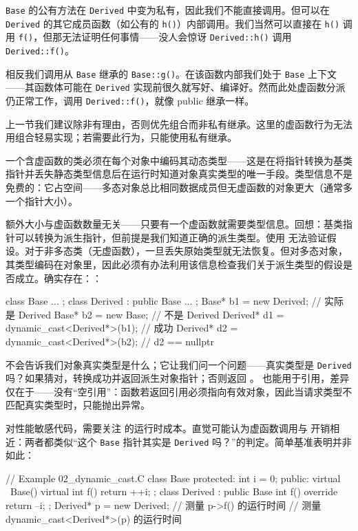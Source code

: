 \texttt{Base} 的公有方法在 \texttt{Derived} 中变为私有，因此我们不能直接调用。但可以在 \texttt{Derived} 的其它成员函数（如公有的 \texttt{h()}）内部调用。我们当然可以直接在 \texttt{h()} 调用 \texttt{f()}，但那无法证明任何事情——没人会惊讶 \texttt{Derived::h()} 调用 \texttt{Derived::f()}。

相反我们调用从 \texttt{Base} 继承的 \texttt{Base::g()}。在该函数内部我们处于 \texttt{Base} 上下文——其函数体可能在 \texttt{Derived} 实现前很久就写好、编译好。然而此处虚函数分派仍正常工作，调用 \texttt{Derived::f()}，就像 public 继承一样。

上一节我们建议除非有理由，否则优先组合而非私有继承。这里的虚函数行为无法用组合轻易实现；若需要此行为，只能使用私有继承。

一个含虚函数的类必须在每个对象中编码其动态类型——这是在将指针转换为基类指针并丢失静态类型信息后在运行时知道对象真实类型的唯一手段。类型信息不是免费的：它占空间——多态对象总比相同数据成员但无虚函数的对象更大（通常多一个指针大小）。

额外大小与虚函数数量无关——只要有一个虚函数就需要类型信息。回想：基类指针可以转换为派生指针，但前提是我们知道正确的派生类型。使用  无法验证假设。对于非多态类（无虚函数），一旦丢失原始类型就无法恢复。但对多态对象，其类型编码在对象里，因此必须有办法利用该信息检查我们关于派生类型的假设是否成立。确实存在：：

\begin{code}
class Base { ... };
class Derived : public Base { ... };
Base* b1 = new Derived;     // 实际是 Derived
Base* b2 = new Base;   // 不是 Derived
Derived* d1 = dynamic_cast<Derived*>(b1);  // 成功
Derived* d2 = dynamic_cast<Derived*>(b2);  // d2 == nullptr
\end{code}

 不会告诉我们对象真实类型是什么；它让我们问一个问题——真实类型是 \texttt{Derived} 吗？如果猜对，转换成功并返回派生对象指针；否则返回 。 也能用于引用，差异仅在于——没有“空引用”：函数若返回引用必须指向有效对象，因此当请求类型不匹配真实类型时，只能抛出异常。

对性能敏感代码，需要关注  的运行时成本。直觉可能认为虚函数调用与  开销相近：两者都类似“这个 \texttt{Base} 指针其实是 \texttt{Derived} 吗？”的判定。简单基准表明并非如此：

\begin{code}
// Example 02_dynamic_cast.C
class Base {
  protected:
  int i = 0;
  public:
  virtual ~Base() {}
  virtual int f() { return ++i; }
};
class Derived : public Base {
  int f() override { return --i; }
};
Derived* p = new Derived;
// 测量 p->f() 的运行时间
// 测量 dynamic_cast<Derived*>(p) 的运行时间
\end{code}

